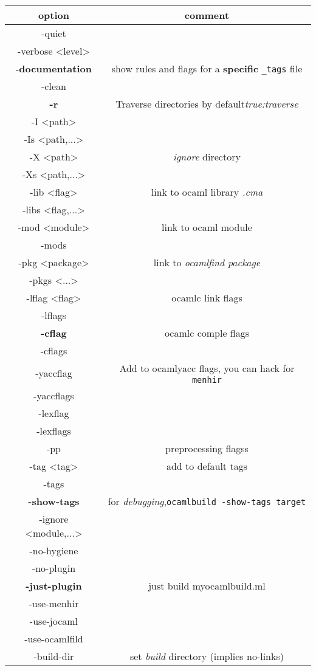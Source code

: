 \begin{longtable}{|c|c|}
  \hline
option & comment \\
  \endfirsthead
\hline
-quiet & \\
-verbose <level> & \\
-\textbf{documentation} & show rules and flags for a \textbf{specific} \verb|_tags| file
\\
-clean & \\
\textbf{-r} & Traverse directories by default\textit{true:traverse} \\
-I <path> & \\
-Is <path,...> & \\
-X <path> & \textit{ignore} directory \\
-Xs <path,...> & \\
-lib <flag> & link to ocaml library \textit{.cma} \\
-libs <flag,...> & \\
-mod <module> & link to ocaml module \\
-mods & \\
-pkg <package> & link to \textit{ocamlfind package} \\
-pkgs <...> & \\
-lflag  <flag> & ocamlc link flags \\
-lflags & \\
\textbf{-cflag} & ocamlc comple flags \\
-cflags & \\
-yaccflag &  Add to ocamlyacc flags, you can hack for \verb|menhir| \\
-yaccflags & \\
-lexflag & \\
-lexflags & \\
-pp & preprocessing flagss\\
-tag <tag> & add to default tags \\
-tags & \\
\textbf{-show-tags} & for \textit{debugging},\verb|ocamlbuild -show-tags target| \\
-ignore <module,...> & \\
-no-hygiene & \\
-no-plugin & \\
\textbf{-just-plugin} & just build myocamlbuild.ml \\
-use-menhir & \\
-use-jocaml & \\
-use-ocamlfild & \\
-build-dir & set \textit{build} directory (implies no-links)\\

\end{longtable}
